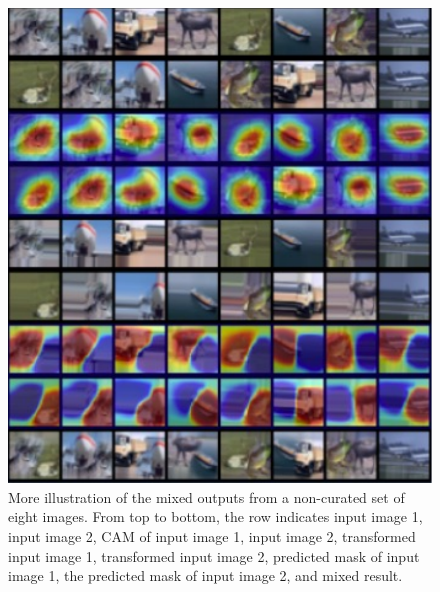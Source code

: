 \documentclass[10pt]{article} %
\begin{document}
\begin{figure}[ht]
\centering
\includegraphics[width=\textwidth]{./img/cifar10_app}
\caption{More illustration of the mixed outputs from a non-curated set of eight images. From top to bottom, the row indicates input image 1, input image 2, CAM of input image 1, input image 2, transformed input image 1, transformed input image 2, predicted mask of input image 1, the predicted mask of input image 2, and mixed result.}
\label{fig:app2}
\end{figure}
\end{document}
